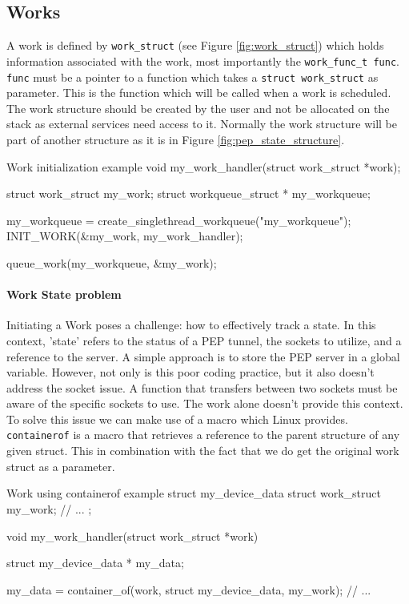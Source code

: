 \documentclass[a4paper,english, 11pt]{report}
\begin{document}
\subsection{Works}
A work is defined by \verb|work_struct| (see Figure \ref{fig:work_struct}) which holds information associated with the work, most importantly the \verb|work_func_t func|. \verb|func| must be a pointer to a function which takes a \verb|struct work_struct| as parameter. This is the function which will be called when a work is scheduled. The work structure should be created by the user and not be allocated on the stack as external services need access to it. Normally the work structure will be part of another structure as it is in Figure \ref{fig:pep_state_structure}.\\


\begin{autonumlstlisting}[label=lst:work_init]{Work initialization example}
void my_work_handler(struct work_struct *work);

struct work_struct my_work;
struct workqueue_struct * my_workqueue;

my_workqueue = create_singlethread_workqueue("my_workqueue");
INIT_WORK(&my_work, my_work_handler);

queue_work(my_workqueue, &my_work);
\end{autonumlstlisting}

\paragraph{Work State problem}
Initiating a Work poses a challenge: how to effectively track a state. In this context, 'state' refers to the status of a PEP tunnel, the sockets to utilize, and a reference to the server. A simple approach is to store the PEP server in a global variable. However, not only is this poor coding practice, but it also doesn't address the socket issue. A function that transfers between two sockets must be aware of the specific sockets to use. The work alone doesn't provide this context.\\

To solve this issue we can make use of a macro which Linux provides. \verb|containerof| is a macro that retrieves a reference to the parent structure of any given struct. This in combination with the fact that we do get the original work struct as a parameter.\\

\begin{autonumlstlisting}[label=lst:work_containerof]{Work using containerof example}
struct my_device_data {
    struct work_struct my_work;
    // ...
};

void my_work_handler(struct work_struct *work)
{
   struct my_device_data * my_data;

   my_data = container_of(work, struct my_device_data,  my_work);
   // ...
}
\end{autonumlstlisting}
\end{document}
